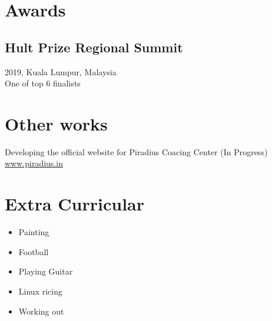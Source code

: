 \documentclass{article}
\begin{document}
\section{Awards}
\subsection{Hult Prize Regional Summit}
2019, Kuala Lumpur, Malaysia\\
One of top 6 finalists


\section{Other works} 
Developing the official website for Piradius Coacing Center (In Progress)\\
\href{https:\\www.piradius.in}{www.piradius.in}


\section{Extra Curricular}
\begin{itemize}
	\item Painting
	\item Football
	\item Playing Guitar
	\item Linux ricing
	\item Working out
\end{itemize}
\end{document}
